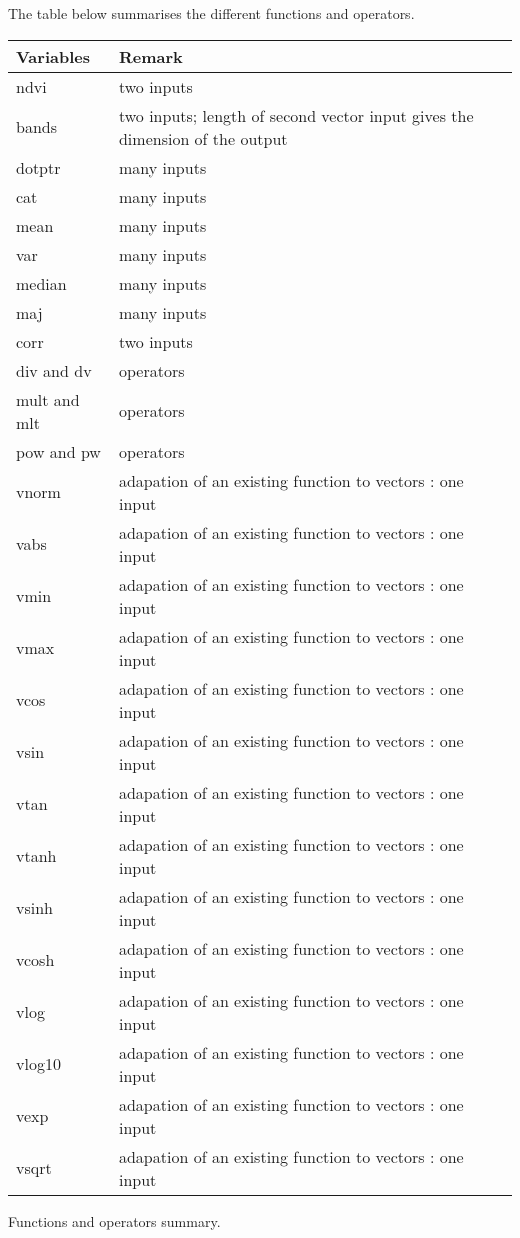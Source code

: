 The table below summarises the different functions and operators.


\begin{center} 
\begin{tabular}{||l|l||}
\hline
\bf Variables & \bf Remark \\
\hline\hline
ndvi &  two inputs\\
bands & two inputs; length of second vector input gives the dimension of the output \\
dotptr &  many inputs \\
cat & many inputs \\
mean & many inputs \\
var & many inputs \\
median & many inputs \\
maj & many inputs \\
corr & two inputs \\
div and dv &  operators \\
mult and mlt & operators \\
pow and pw  & operators \\
vnorm  & adapation of an existing function to vectors : one input \\
vabs   & adapation of an existing function to vectors : one input \\
vmin   & adapation of an existing function to vectors : one input \\
vmax   & adapation of an existing function to vectors : one input \\
vcos   & adapation of an existing function to vectors : one input \\
vsin   & adapation of an existing function to vectors : one input \\
vtan   & adapation of an existing function to vectors : one input \\
vtanh  & adapation of an existing function to vectors : one input \\
vsinh  & adapation of an existing function to vectors : one input \\
vcosh  & adapation of an existing function to vectors : one input \\
vlog   & adapation of an existing function to vectors : one input \\
vlog10 & adapation of an existing function to vectors : one input \\
vexp   & adapation of an existing function to vectors : one input \\
vsqrt  & adapation of an existing function to vectors : one input \\
\hline
\end{tabular}
\end{center}
\caption{Functions and operators summary.}
\label{variables}



